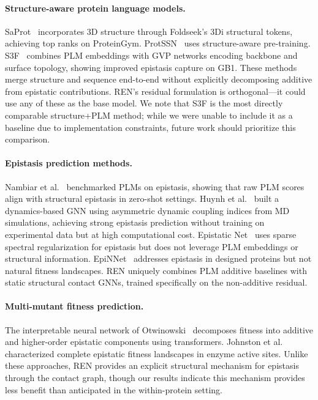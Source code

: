 \documentclass{article}
\newcommand{\ren}{\textsc{REN}}
\begin{document}
\paragraph{Structure-aware protein language models.}
SaProt~\citep{su2024saprot} incorporates 3D structure through Foldseek's 3Di structural tokens, achieving top ranks on ProteinGym. ProtSSN~\citep{tan2023semantical} uses structure-aware pre-training. S3F~\citep{zhang2024multiscale} combines PLM embeddings with GVP networks encoding backbone and surface topology, showing improved epistasis capture on GB1. These methods merge structure and sequence end-to-end without explicitly decomposing additive from epistatic contributions. \ren{}'s residual formulation is orthogonal---it could use any of these as the base model. We note that S3F is the most directly comparable structure+PLM method; while we were unable to include it as a baseline due to implementation constraints, future work should prioritize this comparison.

\paragraph{Epistasis prediction methods.}
Nambiar et al.~\citep{Nambiar2025PLMEpistasis} benchmarked PLMs on epistasis, showing that raw PLM scores align with structural epistasis in zero-shot settings. Huynh et al.~\citep{Huynh2025DynamicsEpistasis} built a dynamics-based GNN using asymmetric dynamic coupling indices from MD simulations, achieving strong epistasis prediction without training on experimental data but at high computational cost. Epistatic Net~\citep{aghazadeh2021epistatic} uses sparse spectral regularization for epistasis but does not leverage PLM embeddings or structural information. EpiNNet~\citep{lipsh2024addressing} addresses epistasis in designed proteins but not natural fitness landscapes. \ren{} uniquely combines PLM additive baselines with static structural contact GNNs, trained specifically on the non-additive residual.

\paragraph{Multi-mutant fitness prediction.}
The interpretable neural network of Otwinowski~\citep{otwinowski2025interpretable} decomposes fitness into additive and higher-order epistatic components using transformers. Johnston et al.~\citep{johnston2024combinatorial} characterized complete epistatic fitness landscapes in enzyme active sites. Unlike these approaches, \ren{} provides an explicit structural mechanism for epistasis through the contact graph, though our results indicate this mechanism provides less benefit than anticipated in the within-protein setting.
\end{document}
